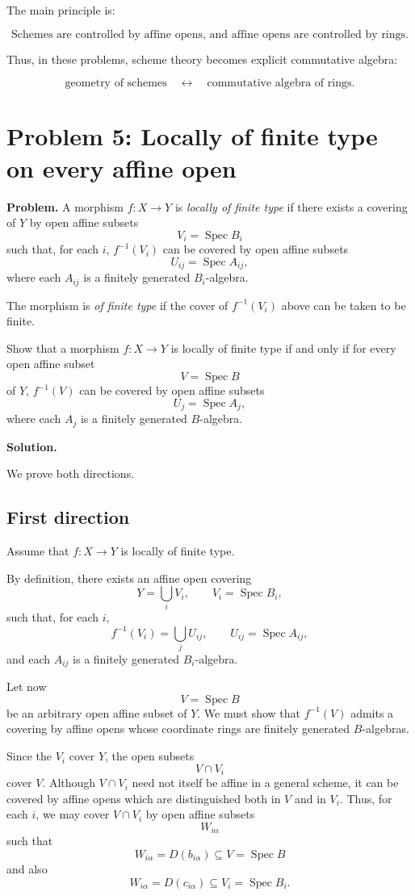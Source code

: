\documentclass[12pt,a4paper]{article}
\DeclareMathOperator{\Spec}{Spec}
\providecommand{\Spec}{\operatorname{Spec}}
\theoremstyle{notespace}
\begin{document}
The main principle is:

\[
\boxed{
	\text{Schemes are controlled by affine opens, and affine opens are controlled by rings.}
}
\]

Thus, in these problems, scheme theory becomes explicit commutative algebra:

\[
\boxed{
	\text{geometry of schemes}
	\quad\longleftrightarrow\quad
	\text{commutative algebra of rings}.
}
\]

\section{Problem 5: Locally of finite type on every affine open}

\textbf{Problem.}
A morphism \(f:X\to Y\) is \emph{locally of finite type} if there exists a covering of \(Y\) by open affine subsets
\[
V_i=\Spec B_i
\]
such that, for each \(i\), \(f^{-1}(V_i)\) can be covered by open affine subsets
\[
U_{ij}=\Spec A_{ij},
\]
where each \(A_{ij}\) is a finitely generated \(B_i\)-algebra.

The morphism is \emph{of finite type} if the cover of \(f^{-1}(V_i)\) above can be taken to be finite.

Show that a morphism \(f:X\to Y\) is locally of finite type if and only if for every open affine subset
\[
V=\Spec B
\]
of \(Y\), \(f^{-1}(V)\) can be covered by open affine subsets
\[
U_j=\Spec A_j,
\]
where each \(A_j\) is a finitely generated \(B\)-algebra.

\bigskip

\textbf{Solution.}

We prove both directions.

\subsection*{First direction}

Assume that \(f:X\to Y\) is locally of finite type.

By definition, there exists an affine open covering
\[
Y=\bigcup_i V_i,
\qquad
V_i=\Spec B_i,
\]
such that, for each \(i\),
\[
f^{-1}(V_i)=\bigcup_j U_{ij},
\qquad
U_{ij}=\Spec A_{ij},
\]
and each \(A_{ij}\) is a finitely generated \(B_i\)-algebra.

Let now
\[
V=\Spec B
\]
be an arbitrary open affine subset of \(Y\). We must show that \(f^{-1}(V)\) admits a covering by affine opens whose coordinate rings are finitely generated \(B\)-algebras.

Since the \(V_i\) cover \(Y\), the open subsets
\[
V\cap V_i
\]
cover \(V\). Although \(V\cap V_i\) need not itself be affine in a general scheme, it can be covered by affine opens which are distinguished both in \(V\) and in \(V_i\). Thus, for each \(i\), we may cover \(V\cap V_i\) by open affine subsets
\[
W_{i\alpha}
\]
such that
\[
W_{i\alpha}=D(b_{i\alpha})\subseteq V=\Spec B
\]
and also
\[
W_{i\alpha}=D(c_{i\alpha})\subseteq V_i=\Spec B_i.
\]
\end{document}
